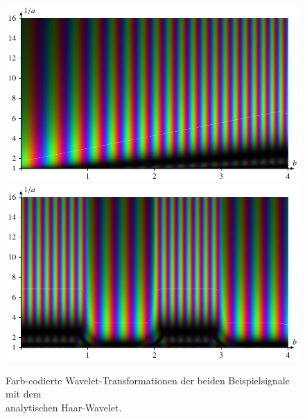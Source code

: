 \begin{figure}
	\centering
	\includegraphics{papers/complex/images/chirp_ahaar.pdf}
	\includegraphics{papers/complex/images/square_ahaar.pdf}
	\caption{Farb-codierte Wavelet-Transformationen der beiden Beispielsignale mit dem \\ analytischen Haar-Wavelet.}
	\label{complex:ahaar-ex}
\end{figure}
